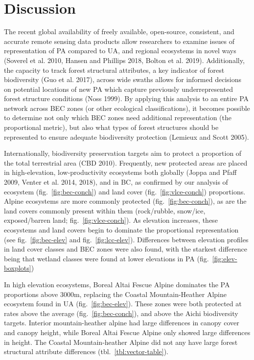\documentclass[10pt,oneside]{article}
\begin{document}
\hypertarget{discussion}{%
\section{Discussion}\label{discussion}}

The recent global availability of freely available, open-source,
consistent, and accurate remote sensing data products allow researchers
to examine issues of representation of PA compared to UA, and regional
ecosystems in novel ways (Soverel et al. 2010, Hansen and Phillips 2018,
Bolton et al. 2019). Additionally, the capacity to track forest
structural attributes, a key indicator of forest biodiversity (Guo et
al. 2017), across wide swaths allows for informed decisions on potential
locations of new PA which capture previously underrepresented forest
structure conditions (Noss 1999). By applying this analysis to an entire
PA network across BEC zones (or other ecological classifications), it
becomes possible to determine not only which BEC zones need additional
representation (the proportional metric), but also what types of forest
structures should be represented to ensure adequate biodiversity
protection (Lemieux and Scott 2005).

Internationally, biodiversity preservation targets aim to protect a
proportion of the total terrestrial area (CBD 2010). Frequently, new
protected areas are placed in high-elevation, low-productivity
ecosystems both globally (Joppa and Pfaff 2009, Venter et al. 2014,
2018), and in BC, as confirmed by our analysis of ecosystem
(fig.~\ref{fig:bec-conch}) and land cover (fig.~\ref{fig:vlce-conch})
proportions. Alpine ecosystems are more commonly protected
(fig.~\ref{fig:bec-conch}), as are the land covers commonly present
within them (rock/rubble, snow/ice, exposed/barren land;
fig.~\ref{fig:vlce-conch}). As elevation increases, these ecosystems and
land covers begin to dominate the proportional representation (see
fig.~\ref{fig:bec-elev} and fig.~\ref{fig:lcc-elev}). Differences
between elevation profiles in land cover classes and BEC zones were also
found, with the starkest difference being that wetland classes were
found at lower elevations in PA (fig.~\ref{fig:elev-boxplots})

In high elevation ecosystems, Boreal Altai Fescue Alpine dominates the
PA proportions above 3000m, replacing the Coastal Mountain-Heather
Alpine ecosystem found in UA (fig.~\ref{fig:bec-elev}). These zones were
both protected at rates above the average (fig.~\ref{fig:bec-conch}),
and above the Aichi biodiversity targets. Interior mountain-heather
alpine had large differences in canopy cover and canopy height, while
Boreal Altai Fescue Alpine only showed large differences in height. The
Coastal Mountain-heather Alpine did not any have large forest structural
attribute differences (tbl.~\ref{tbl:vector-table}).
\end{document}
